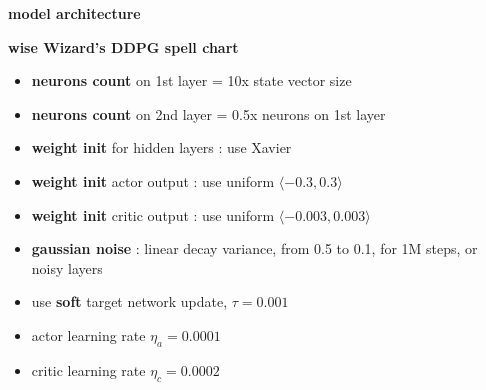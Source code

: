 \documentclass[xcolor=dvipsnames]{beamer}
\begin{document}
\begin{frame}{\bf model architecture}


\end{frame}


\begin{frame}{\bf wise Wizard's DDPG spell chart}
  \begin{itemize}
    \item {\bf \color{red} neurons count} on 1st layer = 10x  state vector size
    \item {\bf \color{red} neurons count} on 2nd layer = 0.5x neurons on 1st layer
    \item {\bf \color{red} weight init} for hidden layers : use Xavier
    \item {\bf \color{red} weight init} actor output  : use uniform $\langle -0.3, 0.3 \rangle$
    \item {\bf \color{red} weight init} critic output : use uniform $\langle -0.003, 0.003 \rangle$
    \item {\bf \color{red} gaussian noise} : linear decay variance, from 0.5 to 0.1, for 1M steps, or noisy layers
    \item use {\bf \color{red} soft} target network update, $\tau = 0.001$
    \item actor learning rate $\eta_a = 0.0001$
    \item critic learning rate $\eta_c = 0.0002$
  \end{itemize}
\end{frame}
\end{document}
